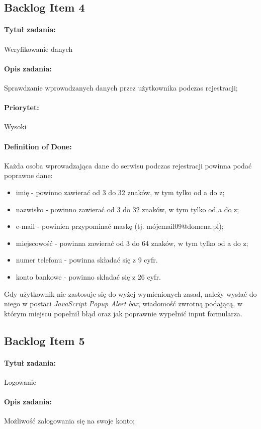 \documentclass[a4paper]{article}
\begin{document}
	\subsection{Backlog Item 4}
	\paragraph{Tytuł zadania:} Weryfikowanie danych
	\paragraph{Opis zadania:} Sprawdzanie wprowadzanych danych przez użytkownika podczas rejestracji;
	\paragraph{Priorytet:} Wysoki
	\paragraph{Definition of Done:} Każda osoba wprowadzająca dane do serwisu podczas rejestracji powinna podać poprawne dane:
	\begin{itemize}
		\item imię - powinno zawierać od 3 do 32 znaków, w tym tylko od a do z;
		\item nazwisko - powinno zawierać od 3 do 32 znaków, w tym tylko od a do z;
		\item e-mail - powinien przypominać maskę (tj. mójemail09@domena.pl);
		\item miejscowość - powinna zawierać od 3 do 64 znaków, w tym tylko od a do z;
		\item numer telefonu - powinna składać się z 9 cyfr.
		\item konto bankowe - powinno składać się z 26 cyfr.	
	\end{itemize}
	Gdy użytkownik nie zastosuje się do wyżej wymienionych zasad, należy wysłać do niego w postaci \emph{JavaScript Popup Alert box}, wiadomość zwrotną podającą, w którym miejscu popełnił błąd oraz jak poprawnie wypełnić input formularza.
	
	\subsection{Backlog Item 5}
	\paragraph{Tytuł zadania:} Logowanie
	\paragraph{Opis zadania:} Możliwość zalogowania się na swoje konto;
\end{document}
